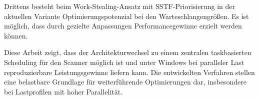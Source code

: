 \begin{sloppypar}
\noindent Drittens besteht beim Work-Stealing-Ansatz mit \acs{SSTF}-Priorisierung in der aktuellen Variante Optimierungspotenzial bei den Warteschlangengrößen. 
Es ist möglich, dass durch gezielte Anpassungen Performancegewinne erzielt werden können. 


\vspace{7.56mm}

\noindent Diese Arbeit zeigt,
dass der Architekturwechsel zu einem zentralen taskbasierten Scheduling für den Scanner möglich ist 
und unter Windows bei paralleler Last reproduzierbare Leistungsgewinne liefern kann. 
Die entwickelten Verfahren stellen eine belastbare Grundlage für weiterführende Optimierungen dar, 
insbesondere bei Lastprofilen mit hoher Parallelität.

\end{sloppypar}
